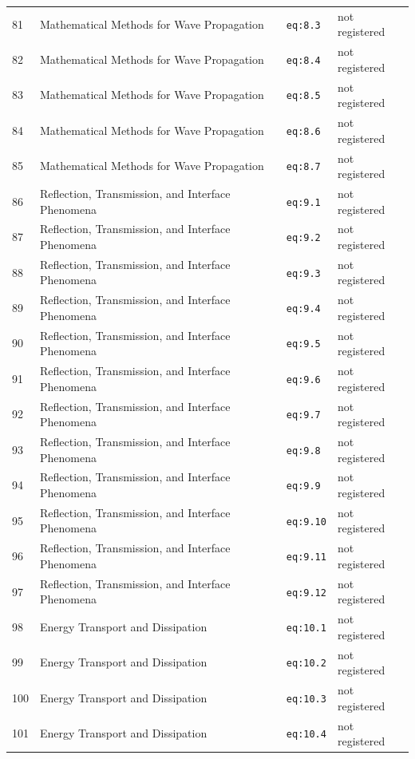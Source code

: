 \begin{longtable}{@{}p{1.1cm}p{5.6cm}p{3.4cm}p{2.9cm}@{}}
81 & Mathematical Methods for Wave Propagation & \texttt{eq:8.3} & not registered \\
82 & Mathematical Methods for Wave Propagation & \texttt{eq:8.4} & not registered \\
83 & Mathematical Methods for Wave Propagation & \texttt{eq:8.5} & not registered \\
84 & Mathematical Methods for Wave Propagation & \texttt{eq:8.6} & not registered \\
85 & Mathematical Methods for Wave Propagation & \texttt{eq:8.7} & not registered \\
86 & Reflection, Transmission, and Interface Phenomena & \texttt{eq:9.1} & not registered \\
87 & Reflection, Transmission, and Interface Phenomena & \texttt{eq:9.2} & not registered \\
88 & Reflection, Transmission, and Interface Phenomena & \texttt{eq:9.3} & not registered \\
89 & Reflection, Transmission, and Interface Phenomena & \texttt{eq:9.4} & not registered \\
90 & Reflection, Transmission, and Interface Phenomena & \texttt{eq:9.5} & not registered \\
91 & Reflection, Transmission, and Interface Phenomena & \texttt{eq:9.6} & not registered \\
92 & Reflection, Transmission, and Interface Phenomena & \texttt{eq:9.7} & not registered \\
93 & Reflection, Transmission, and Interface Phenomena & \texttt{eq:9.8} & not registered \\
94 & Reflection, Transmission, and Interface Phenomena & \texttt{eq:9.9} & not registered \\
95 & Reflection, Transmission, and Interface Phenomena & \texttt{eq:9.10} & not registered \\
96 & Reflection, Transmission, and Interface Phenomena & \texttt{eq:9.11} & not registered \\
97 & Reflection, Transmission, and Interface Phenomena & \texttt{eq:9.12} & not registered \\
98 & Energy Transport and Dissipation & \texttt{eq:10.1} & not registered \\
99 & Energy Transport and Dissipation & \texttt{eq:10.2} & not registered \\
100 & Energy Transport and Dissipation & \texttt{eq:10.3} & not registered \\
101 & Energy Transport and Dissipation & \texttt{eq:10.4} & not registered \\

\end{longtable}
